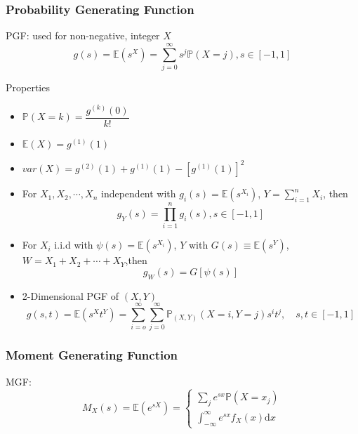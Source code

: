 \subsubsection{Probability Generating Function}
    PGF: used for non-negative, integer $X$
    \begin{equation}
        g(s)=\mathbb{E}(s^X)=\sum_{j=0}^\infty s^j\mathbb{P}(X=j)    ,s\in[-1,1]
    \end{equation}

\begin{point}
        Properties
\end{point}

    \begin{itemize}
        \item $\mathbb{P}(X=k)=\dfrac{g^{(k)}(0)}{k!}$
        \item $\mathbb{E}(X)=g^{(1)}(1)$
        \item $var(X)=g^{(2)}(1)+g^{(1)}(1)-[g^{(1)}(1)]^2 $
        \item For $X_1,X_2,\cdots,X_n$ independent with $g_i(s)=\mathbb{E}(s^{X_i})$, $Y={\displaystyle \sum_{i=1}^n} X_i$, then
        \begin{equation}    
            g_Y(s)=\prod_{i=1}^n g_i(s),s\in[-1,1]
        \end{equation}
        \item For ${X_i}$ i.i.d with $\psi(s)=\mathbb{E}(s^{X_i})$, $Y$ with $G(s)\equiv\mathbb{E}(s^{Y})$, $W=X_1+X_2+\cdots +X_Y$,then
        \begin{equation}    
            g_W(s)=G[\psi(s)]    
        \end{equation}
        \item 2-Dimensional PGF of $(X,Y)$
        \begin{equation}    
            g(s,t)=\mathbb{E}(s^Xt^Y)=\sum_{i=o}^\infty\sum_{j=0}^\infty \mathbb{P}_{(X,Y)}(X=i,Y=j)s^it^j,\quad s,t\in[-1,1]
        \end{equation}
    \end{itemize}
\subsubsection{Moment Generating Function}
    MGF: 
    \begin{equation}
        M_X(s)=\mathbb{E}(e^{sX})=\begin{cases}
            \sum_je^{sx}\mathbb{P}(X=x_j)\\
            \int_{-\infty}^\infty e^{sx}f_X(x)\mathrm{d}x
        \end{cases}
    \end{equation}

